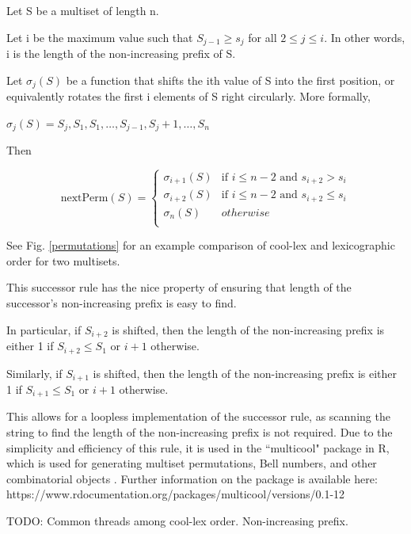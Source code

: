 \noindent Let S be a multiset of length n.

\noindent Let i be the maximum value such that $S_{j-1} \ge s_j$ for all $2 \le j \le i$.  In other words, i is the length of the non-increasing prefix of S.  

\noindent Let $\sigma_j(S)$ be a function that shifts the ith value of S into the first position, or equivalently rotates the first i elements of S right circularly.  More formally, 

\noindent $\sigma_j(S)=S_j,S_1,S_1,\dots,S_{j-1},S_j+1,\dots,S_n $

Then

\begin{equation*}
    \text{nextPerm}(S) = \begin{cases}
	\sigma_{i+1}(S) & \text{if $i \le n-2$ and $s_{i+2} > s_i$}\\
	\sigma_{i+2}(S) & \text{if $i \le n-2$ and $s_{i+2} \le s_i$}\\
	\sigma_{n}(S) & otherwise\\
\end{cases}
\end{equation*}


See Fig. \ref{permutations} for an example comparison of cool-lex and lexicographic order for two multisets.

This successor rule has the nice property of ensuring that length of the successor's non-increasing prefix is easy to find.

In particular, if $S_{i+2}$ is shifted, then the length of the non-increasing prefix is either 1 if $S_{i+2}\le S_1$ or $i+1$ otherwise. 

Similarly, if $S_{i+1}$ is shifted, then the length of the non-increasing prefix is either 1 if $S_{i+1}\le S_1$ or $i+1$ otherwise. 

This allows for a loopless implementation of the successor rule, as scanning the string to find the length of the non-increasing prefix is not required.  Due to the simplicity and efficiency of this rule, it is used in the ``multicool" package in R, which is used for generating multiset permutations, Bell numbers, and other combinatorial objects \cite{multicool_2021}.   Further information on the package is available here: https://www.rdocumentation.org/packages/multicool/versions/0.1-12

TODO: Common threads among cool-lex order. Non-increasing prefix. 




